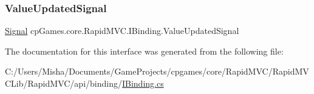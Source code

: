 \mbox{\label{interfacecp_games_1_1core_1_1_rapid_m_v_c_1_1_i_binding_a24032f62e91ba7f08581be9afd09b2c7}} 
\subsubsection{\texorpdfstring{ValueUpdatedSignal}{ValueUpdatedSignal}}
{\footnotesize\ttfamily \mbox{\hyperlink{classcp_games_1_1core_1_1_rapid_m_v_c_1_1_signal}{Signal}} cp\+Games.\+core.\+Rapid\+M\+V\+C.\+I\+Binding.\+Value\+Updated\+Signal\hspace{0.3cm}{\ttfamily [get]}}



The documentation for this interface was generated from the following file\+:\begin{DoxyCompactItemize}
\item 
C\+:/\+Users/\+Misha/\+Documents/\+Game\+Projects/cpgames/core/\+Rapid\+M\+V\+C/\+Rapid\+M\+V\+C\+Lib/\+Rapid\+M\+V\+C/api/binding/\mbox{\hyperlink{_i_binding_8cs}{I\+Binding.\+cs}}\end{DoxyCompactItemize}
